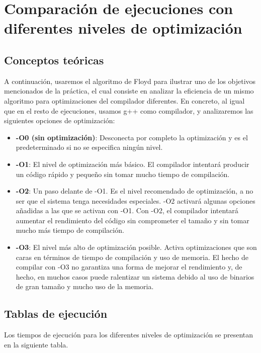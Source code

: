 \documentclass{homework}
\begin{document}
    \section{Comparación de ejecuciones con diferentes niveles de optimización}

    \subsection{Conceptos teóricas}

    A continuación, usaremos el algoritmo de Floyd para ilustrar uno de los objetivos mencionados de la práctica, 
    el cual consiste en analizar la eficiencia de un mismo algoritmo para optimizaciones del compilador diferentes.
    En concreto, al igual que en el resto de ejecuciones, usamos g++ como compilador, y analizaremos las siguientes
    opciones de optimización:

    \begin{itemize}
        \item \textbf{-O0 (sin optimización)}: Desconecta por completo la optimización y es el predeterminado si 
        no se especifica ningún nivel.
        \item \textbf{-O1}: El nivel de optimización más básico. El compilador intentará producir un código rápido
        y pequeño sin tomar mucho tiempo de compilación. 
        \item \textbf{-O2}: Un paso delante de -O1. Es el nivel recomendado de optimización, a no ser que el sistema
        tenga necesidades especiales. -O2 activará algunas opciones añadidas a las que se activan con -O1. 
        Con -O2, el compilador intentará aumentar el rendimiento del código sin comprometer el tamaño y sin tomar 
        mucho más tiempo de compilación.
        \item \textbf{-O3}:  El nivel más alto de optimización posible. Activa optimizaciones que son caras en términos 
        de tiempo de compilación y uso de memoria. El hecho de compilar con -O3 no garantiza una forma de mejorar el 
        rendimiento y, de hecho, en muchos casos puede ralentizar un sistema debido al uso de binarios de gran tamaño y 
        mucho uso de la memoria.
    \end{itemize} 
    
    \subsection{Tablas de ejecución} 

    Los tiempos de ejecución para los diferentes niveles de optimización se presentan en la siguiente tabla. 
\end{document}
